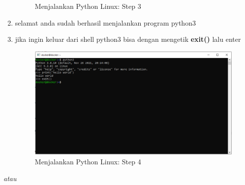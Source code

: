 \begin{enumerate}
\begin{figure}[H]
        \caption{Menjalankan Python Linux: Step 3}
\end{figure}
\item selamat anda sudah berhasil menjalankan program python3
\item jika ingin keluar dari shell python3 bisa dengan mengetik \textbf{exit()} lalu enter
\begin{figure}[H]
        \centerline{\includegraphics[scale=0.5]{figures/menjalankan-python-linux/step4}}
        \caption{Menjalankan Python Linux: Step 4}
\end{figure}
\end{enumerate}

\textit{atau}


